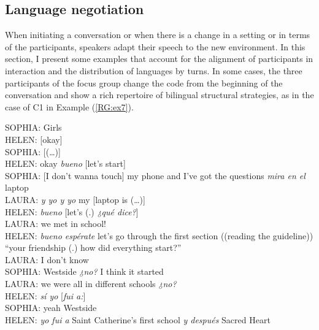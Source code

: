 \documentclass[output=paper]{langscibook}
\begin{document}
\subsection{Language negotiation}\label{RG:sec:05_1}
\largerpage
When initiating a conversation or when there is a change in a setting or in terms of the participants, speakers adapt their speech to the new environment. In this section, I present some examples that account for the alignment of participants in interaction and the distribution of languages by turns. In some cases, the three participants of the focus group change the code from the beginning of the conversation and show a rich repertoire of bilingual structural strategies, as in the case of C1 in Example (\ref{RG:ex7}).\clearpage

\begin{exe}\ex\label{RG:ex7}
SOPHIA:  Girls\\
HELEN: [okay]\\
SOPHIA: [(…)]\\
HELEN: okay \textit{bueno} [let’s start]\\
SOPHIA: [I don’t wanna touch] my phone and I’ve got the questions \textit{mira en el} laptop\\
LAURA: \textit{y yo y yo} my [laptop is (…)]\\
HELEN: \textit{bueno} [let’s (.) \textit{¿qué dice?}]\\
LAURA: we met in school!\\
HELEN: \textit{bueno espérate} let’s go through the first section ((reading the guideline)) “your friendship (.) how did everything start?”\\
LAURA: I don’t know\\
SOPHIA: Westside \textit{¿no?} I think it started\\
LAURA: we were all in different schools \textit{¿no?}\\
HELEN: \textit{sí yo} [\textit{fui a:}] \\
SOPHIA: yeah Westside\\
HELEN: \textit{yo fui a} Saint Catherine’s first school \textit{y después} Sacred Heart\\


\end{exe}
\end{document}
